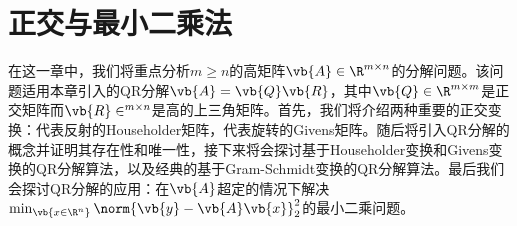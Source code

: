 \chapter{正交与最小二乘法}

在这一章中，我们将重点分析$m\geq n$的高矩阵$\vb{A}\in\R^{m\times n}$的分解问题。该问题适用本章引入的QR分解$\vb{A}=\vb{Q}\vb{R}$，其中$\vb{Q}\in\R^{m\times m}$是正交矩阵而$\vb{R}\in^{m\times n}$是高的上三角矩阵。首先，我们将介绍两种重要的正交变换：代表反射的Householder矩阵，代表旋转的Givens矩阵。随后将引入QR分解的概念并证明其存在性和唯一性，接下来将会探讨基于Householder变换和Givens变换的QR分解算法，以及经典的基于Gram-Schmidt变换的QR分解算法。最后我们会探讨QR分解的应用：在$\vb{A}$超定的情况下解决$\min_{\vb{x\in\R^n}}\norm{\vb{y}-\vb{A}\vb{x}}_2^2$的最小二乘问题。







